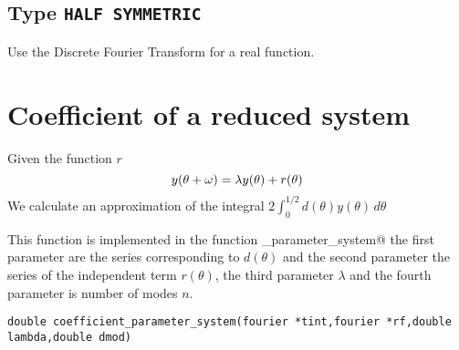 \documentclass{article}
\begin{document}
\subsection{Type \texttt{HALF SYMMETRIC}}
Use  the Discrete Fourier Transform for a real function.  

\section{Coefficient    of a reduced system}
\label{sec:ReducedCoefficient}


Given the function  $r$  
$$\label{reduced_systemcoef}
y(\theta+\omega)=\lambda y(\theta) + r(\theta) \\
$$
We calculate an approximation of the integral $2 \int^{1/2}_0
d(\theta) y(\theta) \, d\theta$ 

This function is implemented in the function
\verb@coefficient_parameter_system@ the first parameter are the series
corresponding to $d(\theta)$ and the second parameter the series of
the independent term $r(\theta)$, the third parameter $\lambda$ and
the fourth parameter is number of modes $n$.

\begin{verbatim}
double coefficient_parameter_system(fourier *tint,fourier *rf,double lambda,double dmod)
\end{verbatim}
\end{document}
